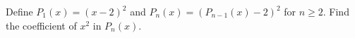 Define $P_1(x)=(x-2)^2$ and $P_n(x)=(P_{n-1}(x)-2)^2$ for $n\ge2$. Find the coefficient of $x^2$ in $P_n(x)$.
